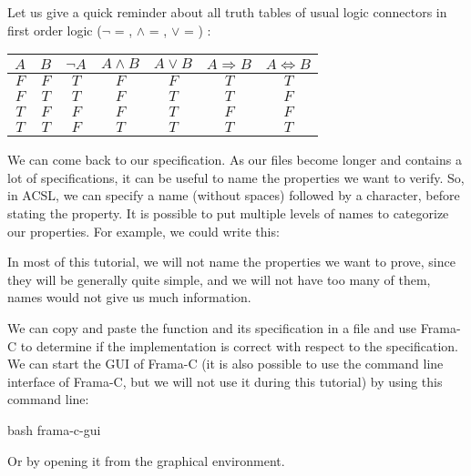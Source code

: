 \begin{Information}
  Let us give a quick reminder about all
  truth tables of usual logic connectors in first order logic
  ($\neg$ = \CodeInline{!}, $\wedge$ = \CodeInline{\&\&}, $\vee$ = \CodeInline{||}) :

\begin{longtabu}{|c|c|c|c|c|c|c|} \hline
$A$ & $B$ & $\neg A$ & $A \wedge B$ & $A \vee B$ & $A \Rightarrow B$ & $A \Leftrightarrow B$ \\ \hline
$F$ & $F$ & $T$ & $F$ & $F$ & $T$ & $T$ \\ \hline
$F$ & $T$ & $T$ & $F$ & $T$ & $T$ & $F$ \\ \hline
$T$ & $F$ & $F$ & $F$ & $T$ & $F$ & $F$ \\ \hline
$T$ & $T$ & $F$ & $T$ & $T$ & $T$ & $T$ \\ \hline
\end{longtabu}
\end{Information}


We can come back to our specification. As our files become longer and
contains a lot of specifications, it can be useful to name the
properties we want to verify. So, in ACSL, we can specify a name
(without spaces) followed by a \CodeInline{:} character, before stating the
property.
It is possible to put multiple levels of names to categorize our
properties. For example, we could write this:






In most of this tutorial, we will not name the properties we want to
prove, since they will be generally quite simple, and we will not have
too many of them, names would not give us much information.

We can copy and paste the function  and its specification in
a file  and use Frama-C to determine if the implementation
is correct with respect to the specification. We can start the GUI of Frama-C
(it is also possible to use the command line interface of Frama-C, but we
will not use it during this tutorial) by using this command line:



\begin{CodeBlock}{bash}
frama-c-gui
\end{CodeBlock}



Or by opening it from the graphical environment.



